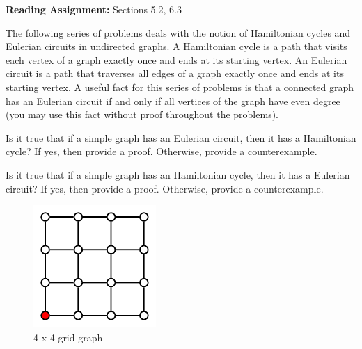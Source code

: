 \documentclass[12pt,twoside]{article}
\begin{document}
\noindent \textbf{Reading Assignment:}   Sections 5.2, 6.3
\\




\begin{problem}{20}  The following series of problems deals with the notion of Hamiltonian cycles and Eulerian circuits in undirected graphs.  A Hamiltonian cycle is a path that visits each vertex of a graph exactly once and ends at its starting vertex.  An Eulerian circuit is a path that traverses all edges of a graph exactly once and ends at its starting vertex.  A useful fact for this series of problems is that a connected graph has an Eulerian circuit if and only if all vertices of the graph have even degree (you may use this fact without proof throughout the problems).

\bparts

 Is it true that if a simple graph has an Eulerian circuit, then it has a Hamiltonian cycle? If yes, then provide a proof.  Otherwise, provide a counterexample.


 Is it true that if a simple graph has an Hamiltonian cycle, then it has a Eulerian circuit? If yes, then provide a proof.  Otherwise, provide a counterexample.



            \begin{figure}[!ht]
                \begin{center}
                    \includegraphics[scale=1.5]{ps5-figs/GridGraph.pdf}
                \caption{4 x 4 grid graph}
                \label{1-fig1}
            \end{center}
            \end{figure}


\end{problem}
\end{document}
